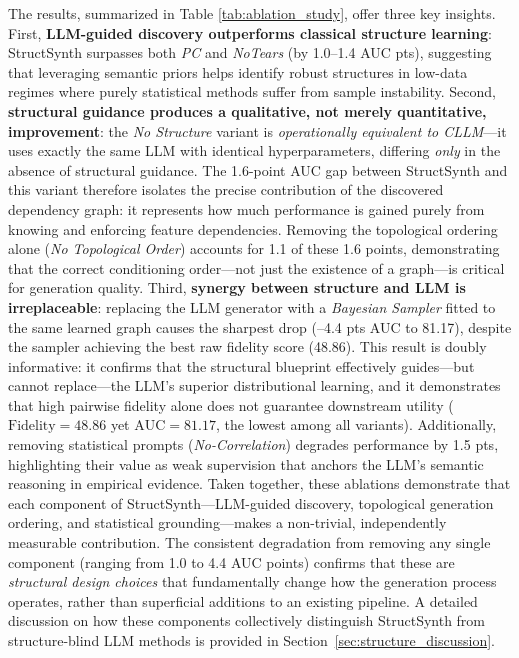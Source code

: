 The results, summarized in Table \ref{tab:ablation_study}, offer three key insights. First, \textbf{LLM-guided discovery outperforms classical structure learning}: \textsf{StructSynth} surpasses both \textit{PC} and \textit{NoTears} (by 1.0--1.4 AUC pts), suggesting that leveraging semantic priors helps identify robust structures in low-data regimes where purely statistical methods suffer from sample instability. Second, \textbf{structural guidance produces a qualitative, not merely quantitative, improvement}: the \textit{No Structure} variant is \emph{operationally equivalent to CLLM}---it uses exactly the same LLM with identical hyperparameters, differing \emph{only} in the absence of structural guidance. The 1.6-point AUC gap between StructSynth and this variant therefore isolates the precise contribution of the discovered dependency graph: it represents how much performance is gained purely from knowing and enforcing feature dependencies. Removing the topological ordering alone (\textit{No Topological Order}) accounts for 1.1 of these 1.6 points, demonstrating that the correct conditioning order---not just the existence of a graph---is critical for generation quality. Third, \textbf{synergy between structure and LLM is irreplaceable}: replacing the LLM generator with a \textit{Bayesian Sampler} fitted to the same learned graph causes the sharpest drop (--4.4 pts AUC to 81.17), despite the sampler achieving the best raw fidelity score (48.86). This result is doubly informative: it confirms that the structural blueprint effectively guides---but cannot replace---the LLM's superior distributional learning, and it demonstrates that high pairwise fidelity alone does not guarantee downstream utility ($\text{Fidelity}=48.86$ yet $\text{AUC}=81.17$, the lowest among all variants). Additionally, removing statistical prompts (\textit{No-Correlation}) degrades performance by 1.5 pts, highlighting their value as weak supervision that anchors the LLM's semantic reasoning in empirical evidence. Taken together, these ablations demonstrate that each component of \textsf{StructSynth}---LLM-guided discovery, topological generation ordering, and statistical grounding---makes a non-trivial, independently measurable contribution. The consistent degradation from removing any single component (ranging from 1.0 to 4.4 AUC points) confirms that these are \emph{structural design choices} that fundamentally change how the generation process operates, rather than superficial additions to an existing pipeline. A detailed discussion on how these components collectively distinguish StructSynth from structure-blind LLM methods is provided in Section~\ref{sec:structure_discussion}.



